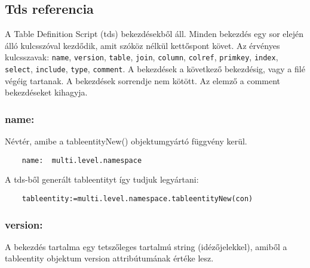 \subsection{Tds referencia}


A Table Definition Script (tds) bekezdésekből áll.
Minden bekezdés egy sor elején álló kulcsszóval kezdődik,
amit szóköz nélkül  kettőspont követ.
Az érvényes kulcsszavak:
\verb!name!, 
\verb!version!, 
\verb!table!, 
\verb!join!, 
\verb!column!, 
\verb!colref!, 
\verb!primkey!, 
\verb!index!, 
\verb!select!, 
\verb!include!, 
\verb!type!, 
\verb!comment!.
A bekezdések a következő bekezdésig, vagy a filé végéig tartanak.
A bekezdések sorrendje nem kötött. Az elemző a comment bekezdéseket 
kihagyja.

\subsubsection*{name:}

    Névtér, amibe a tableentityNew() objektumgyártó függvény kerül.

\begin{verbatim}
    name:  multi.level.namespace
\end{verbatim}

A tds-ből generált tableentityt így tudjuk legyártani:
\begin{verbatim}
    tableentity:=multi.level.namespace.tableentityNew(con)
\end{verbatim}
    
\subsubsection*{version:}
    
    A bekezdés tartalma egy tetszőleges tartalmú string (idézőjelekkel),
    amiből a tableentity objektum version attribútumának értéke lesz.


